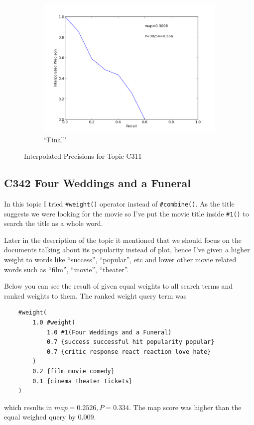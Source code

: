 \documentclass[11pt]{article} %
\begin{document}
\begin{figure}[p]
\begin{subfigure}{0.45\textwidth}
        \includegraphics[width=0.9\linewidth]{311/figure_3.png}
        \caption{``Final''}
    \end{subfigure}
    \caption{Interpolated Precisions for Topic C311}
\end{figure}

\subsection{C342 Four Weddings and a Funeral}

In this topic I tried \verb|#weight()| operator instead of \verb|#combine()|. As the title suggests we were looking for the movie so I've put the movie title inside \verb|#1()| to search the title as a whole word.

Later in the description of the topic it mentioned that we should focus on the documents talking about its popularity instead of plot, hence I've given a higher weight to words like ``success'', ``popular'', etc and lower other movie related words such as ``film'', ``movie'', ``theater''.

Below you can see the result of given equal weights to all search terms and ranked weights to them. The ranked weight query term was

\begin{lstlisting}
    #weight(
        1.0 #weight(
            1.0 #1(Four Weddings and a Funeral)
            0.7 {success successful hit popularity popular}
            0.7 {critic response react reaction love hate}
        )
        0.2 {film movie comedy}
        0.1 {cinema theater tickets}
    )
\end{lstlisting}

which results in $map=0.2526, P=0.334$. The map score was higher than the equal weighed query by 0.009.
\end{document}
